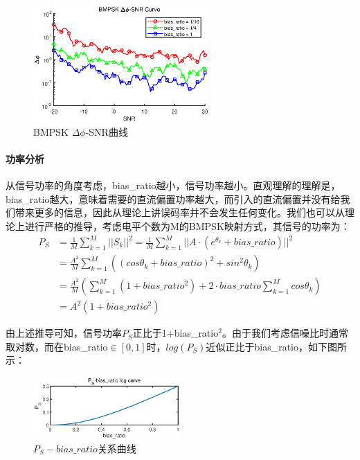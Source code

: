 \begin{figure}[h]
    \centering
    \includegraphics[width=0.6\textwidth]{pic/1-1-6.eps}
    \caption{BMPSK $\Delta\phi$-SNR曲线}
\end{figure}

\paragraph{功率分析}
\indent

从信号功率的角度考虑，bias\_ratio越小，信号功率越小。直观理解的理解是，bias\_ratio越大，意味着需要的直流偏置功率越大，而引入的直流偏置并没有给我们带来更多的信息，因此从理论上讲误码率并不会发生任何变化。我们也可以从理论上进行严格的推导，考虑电平个数为M的BMPSK映射方式，其信号的功率为：
\begin{equation*}
\begin{aligned}
    P_S&=\frac{1}{M}\sum_{k=1}^M||S_k||^2
    =\frac{1}{M}\sum_{k=1}^M||A\cdot(e^{\theta_k}
    +bias\_ratio)||^2\\
    &=\frac{A^2}{M}\sum_{k=1}^M((cos\theta_k+bias\_ratio)^2
    +sin^2\theta_k)\\
    &=\frac{A^2}{M}(\sum_{k=1}^M(1+bias\_ratio^2)
    +2\cdot bias\_ratio\sum_{k=1}^M cos\theta_k)\\
    &=A^2(1+bias\_ratio^2)
\end{aligned}
\end{equation*}

由上述推导可知，信号功率$P_S$正比于1+bias\_ratio$^2$。由于我们考虑信噪比时通常取对数，而在bias\_ratio$\in[0,1]$时，$log(P_S)$近似正比于bias\_ratio，如下图所示：

\begin{figure}[h]
    \centering
    \includegraphics[width=0.5\textwidth]{pic/1-1-7.eps}
    \caption{$P_S-bias\_ratio$关系曲线}
\end{figure}

